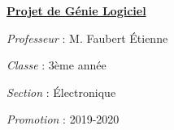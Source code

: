 \documentclass[a4paper,12pt]{report}
\begin{document}
\begin{center}
    \textbf{\underline{Projet de Génie Logiciel}} \par 
    \textit{Professeur} : M. Faubert Étienne \par 
    \textit{Classe} : 3ème année \par 
    \textit{Section} : Électronique \par 
    \textit{Promotion} : 2019-2020 
\end{center}


\tableofcontents

\chapter*{}













\end{document}
